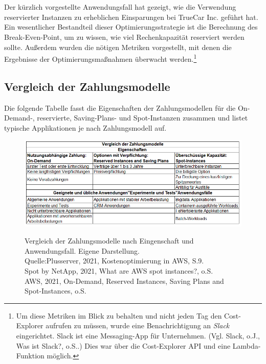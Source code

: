 \\\\
Der kürzlich vorgestellte Anwendungsfall hat gezeigt, wie die Verwendung reservierter Instanzen zu erheblichen Einsparungen bei TrueCar Inc. geführt hat. Ein wesentlicher Bestandteil dieser Optimierungsstrategie ist die Berechnung des Break-Even-Point, um zu wissen, wie viel Rechenkapazität reserviert werden sollte. Außerdem wurden die nötigen Metriken vorgestellt, mit denen die Ergebnisse der Optimierungsmaßnahmen überwacht werden.\footnote{Um diese Metriken im Blick zu behalten und nicht jeden Tag den Cost-Explorer aufrufen zu müssen, wurde eine Benachrichtigung an \textit{Slack} eingerichtet. Slack ist eine Messaging-App für Unternehmen. (Vgl. Slack, o.J., Was ist Slack?, o.S.\cite{SLACK}.) Dies war über die Cost-Explorer API und eine Lambda-Funktion möglich.} 

\subsection*{Vergleich der Zahlungsmodelle}
Die folgende Tabelle fasst die Eigenschaften der Zahlungsmodellen für die On-Demand-, reservierte, Saving-Plans- und Spot-Instanzen zusammen und listet typische Applikationen je nach Zahlungsmodell auf.
\begin{figure}[h!]
    \centering
    \includegraphics[scale=0.7]{sources/Vergleich_der_Zahlungsmodelle}\label{fig:Vergleich_der_Zahlungsmodelle}\\
    \caption[Vergleich der Zahlungsmodelle]{}
    \begin{footnotesize}   
    \label{fig:Vergleich_der_Zahlungsmodelle}  Vergleich der Zahlungsmodelle nach Eingenschaft und Anwendungsfall. Eigene Darstellung.\\
Quelle:Plusserver, 2021, Kostenoptimierung in AWS, S.9.\cite{PS1}\\
Spot by NetApp, 2021, What are AWS spot instances?, o.S.\cite{SPOT1}\\
AWS, 2021, On-Demand, Reserved Instances, Saving Plans and Spot-Instances, o.S.\cite{AMZ02, AMZ07, AMZ11, AMZ19}
\end{footnotesize}
\end{figure}
%

